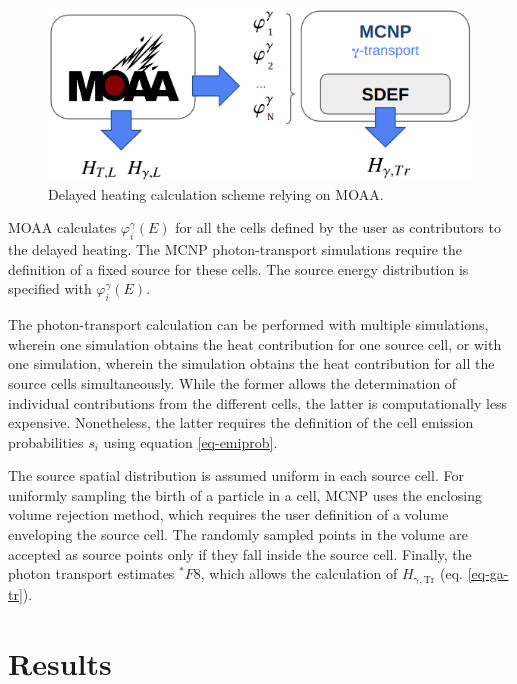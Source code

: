 \documentclass{style/nseJournal}
\begin{document}
\begin{figure}[htbp!]
  \begin{center}
    \includegraphics[width=0.90\linewidth]{figures/heat_flow}
  \end{center}
  \caption{Delayed heating calculation scheme relying on MOAA.}
  \label{fig:workflow_2}
\end{figure}

MOAA calculates $\varphi^\gamma_i(E)$ for all the cells defined by the user as contributors to the delayed heating.
The MCNP photon-transport simulations require the definition of a fixed source for these cells.
The source energy distribution is specified with $\varphi^\gamma_i(E)$.

The photon-transport calculation can be performed with multiple simulations, wherein one simulation obtains the heat contribution for one source cell, or with one simulation, wherein the simulation obtains the heat contribution for all the source cells simultaneously.
While the former allows the determination of individual contributions from the different cells, the latter is computationally less expensive.
Nonetheless, the latter requires the definition of the cell emission probabilities $s_i$ using equation \ref{eq-emiprob}.

The source spatial distribution is assumed uniform in each source cell.
For uniformly sampling the birth of a particle in a cell, MCNP uses the enclosing volume rejection method, which requires the user definition of a volume enveloping the source cell.
The randomly sampled points in the volume are accepted as source points only if they fall inside the source cell.
Finally, the photon transport estimates $^\ast F8$, which allows the calculation of $H_{\mathrm{\gamma, Tr}}$ (eq. \ref{eq-ga-tr}).


\section{Results}
\label{sec:results}
\end{document}

